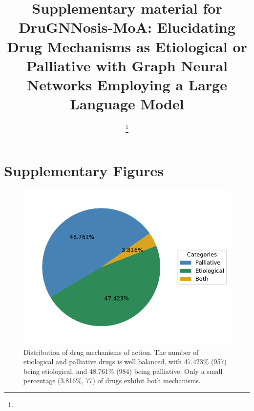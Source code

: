 \documentclass[journal,twoside,web]{ieeecolor}
\begin{document}
\title{Supplementary material for\\ DruGNNosis-MoA: Elucidating Drug Mechanisms as Etiological or Palliative with Graph Neural Networks Employing a Large Language Model}
\author{
\thanks{
}
}

\maketitle






\appendices

\setcounter{figure}{0}
\renewcommand\thefigure{S\arabic{figure}} %

\section{Supplementary Figures}
\begin{figure}[h!]
    \centering
    \includegraphics[width=\linewidth]{Figures/EvsP.pdf}
    \caption{Distribution of drug mechanisms of action. The number of etiological and palliative drugs is well balanced, with 47.423\% (957) being etiological, and 48.761\% (984) being palliative.
    Only a small percentage (3.816\%, 77) of drugs exhibit both mechanisms.}
    \label{fig:EvsP}
\end{figure}
\end{document}
